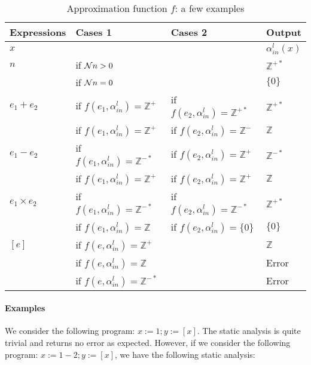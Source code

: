 \begin{table}
	\centering
	\begin{tabular}{@{}p{}p{}p{}p{}@{}}
	\toprule
	Expressions & Cases 1 & Cases 2 & Output \\
	\midrule
	$x$ & & & $\alpha_{in}^l(x)$ \\
	\midrule
	$n$ & if $\mathcal{N}{n} > 0$ & & $\mathbb{Z}^{+*}$ \\
	& if $\mathcal{N}{n} = 0$ & & $\lbrace 0 \rbrace$ \\
	\midrule
	$e_1 + e_2$ & if $f(e_1, \alpha_{in}^l) = \mathbb{Z}^{+}$ & if $f(e_2, \alpha_{in}^l) = \mathbb{Z}^{+*}$ & $\mathbb{Z}^{+*}$ \\
	& if $f(e_1, \alpha_{in}^l) = \mathbb{Z}^{+}$ & if $f(e_2, \alpha_{in}^l) = \mathbb{Z}^{-}$ & $\mathbb{Z}$ \\
	\midrule
	$e_1 - e_2$ & if $f(e_1, \alpha_{in}^l) = \mathbb{Z}^{-*}$ & if $f(e_2, \alpha_{in}^l) = \mathbb{Z}^{+}$ & $\mathbb{Z}^{-*}$ \\
	& if $f(e_1, \alpha_{in}^l) = \mathbb{Z}^{+}$ & if $f(e_2, \alpha_{in}^l) = \mathbb{Z}^{+}$ & $\mathbb{Z}$ \\
	\midrule
	$e_1 \times e_2$ & if $f(e_1, \alpha_{in}^l) = \mathbb{Z}^{-*}$ & if $f(e_2, \alpha_{in}^l) = \mathbb{Z}^{-*}$ & $\mathbb{Z}^{+*}$ \\
	& if $f(e_1, \alpha_{in}^l) = \mathbb{Z}$ & if $f(e_2, \alpha_{in}^l) = \lbrace 0 \rbrace$ & $\lbrace 0 \rbrace$ \\
	\midrule
	$[e]$ & if $f(e, \alpha_{in}^l) = \mathbb{Z}^{+}$ & & $\mathbb{Z}$ \\
	& if $f(e, \alpha_{in}^l) = \mathbb{Z}$ & & Error \\
	& if $f(e, \alpha_{in}^l) = \mathbb{Z}^{-*}$ & & Error \\
	\bottomrule
	\end{tabular}
	\caption{Approximation function $f$: a few examples}
	\label{tab:approx}
\end{table}

\paragraph{Examples}

We consider the following program: $x:= 1; y:= [x]$.
The static analysis is quite trivial and returns no error as expected.
However, if we consider the following program: $x:= 1 - 2; y:= [x]$, we have the following static analysis:

